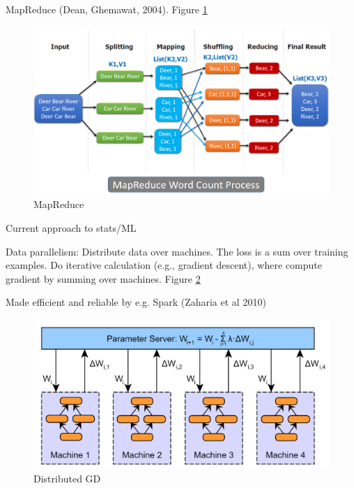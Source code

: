 \documentclass[english]{article}
\begin{document}
\item {MapReduce (Dean, Ghemawat, 2004)}. Figure \ref{mr}
\begin{figure}
\begin{center}
\includegraphics[width=0.5\paperwidth]{mapred}
    \caption{MapReduce}
    \label{mr}
\end{center}
\end{figure}




\item {Current approach to stats/ML}
\bitem
\item Data parallelism: Distribute data over machines. The loss is a sum over training examples. Do iterative calculation (e.g., gradient descent), where compute gradient by summing over machines. Figure \ref{dgd}
\item Made efficient and reliable by e.g. Spark (Zaharia et al 2010) 
\eitem
\begin{figure}
\begin{center}
\includegraphics[width=0.5\paperwidth]{image5}
    \caption{Distributed GD}
    \label{dgd}
\end{center}
\end{figure}
\end{document}
